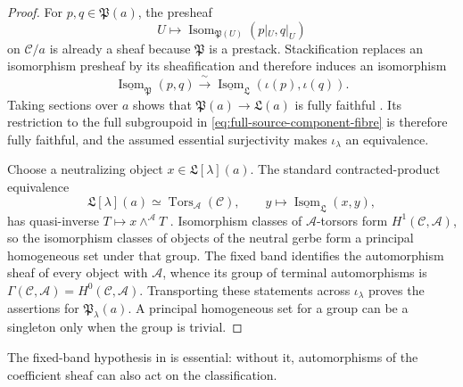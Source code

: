 \begin{proof}
For \(p,q\in\mathfrak P(a)\), the presheaf
\[
 U\longmapsto
 \operatorname{Isom}_{\mathfrak P(U)}(p|_U,q|_U)
\]
on \(\mathcal C/a\) is already a sheaf because \(\mathfrak P\) is a
prestack.  Stackification replaces an isomorphism presheaf by its
sheafification and therefore induces an isomorphism
\[
 \underline{\operatorname{Isom}}_{\mathfrak P}(p,q)
 \xrightarrow{\ \sim\ }
 \underline{\operatorname{Isom}}_{\mathfrak L}
   (\iota(p),\iota(q)).
\]
Taking sections over \(a\) shows that
\(\mathfrak P(a)\to\mathfrak L(a)\) is fully faithful
\cite[Tag 02ZP]{StacksProject}.  Its restriction to the full subgroupoid in
\eqref{eq:full-source-component-fibre} is therefore fully faithful, and the
assumed essential surjectivity makes \(\iota_\lambda\) an equivalence.

Choose a neutralizing object \(x\in\mathfrak L[\lambda](a)\).  The standard
contracted-product equivalence
\[
 \mathfrak L[\lambda](a)\simeq
 \operatorname{Tors}_{\mathscr A}(\mathcal C),
 \qquad
 y\longmapsto
 \underline{\operatorname{Isom}}_{\mathfrak L}(x,y),
\]
has quasi-inverse \(T\mapsto x\wedge^{\mathscr A}T\)
\cite[Chap.~IV]{Giraud1971}.  Isomorphism classes of
\(\mathscr A\)-torsors form \(H^1(\mathcal C,\mathscr A)\), so the
isomorphism classes of objects of the neutral gerbe form a principal
homogeneous set under that group.  The fixed band identifies the
automorphism sheaf of every object with \(\mathscr A\), whence its group of
terminal automorphisms is
\(\Gamma(\mathcal C,\mathscr A)=H^0(\mathcal C,\mathscr A)\).  Transporting
these statements across \(\iota_\lambda\) proves the assertions for
\(\mathfrak P_\lambda(a)\).  A principal homogeneous set for a group can be
a singleton only when the group is trivial.
\end{proof}

The fixed-band hypothesis in  is
essential: without it, automorphisms of the coefficient sheaf can also act
on the classification.

